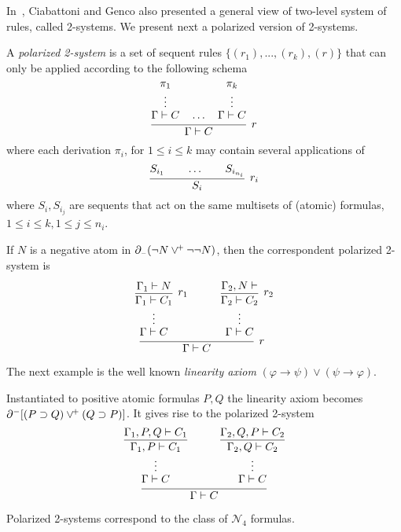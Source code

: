 In~\cite{DBLP:journals/tocl/CiabattoniG18}, Ciabattoni and Genco also presented a general view of two-level system of rules, called 2-systems. We present next a polarized version of 2-systems.
\begin{definition}
A  {\em polarized 2-system} is a set of sequent rules $\{(r_1), . . . , (r_k ), (r)\}$ that can only be applied according to the following schema
\[
\infer[r]{\Gamma\vdash C}
      {\deduce{\Gamma\vdash C\strut}
              {\deduce{\vdots}
                      {\pi_1}}\quad\ldots\quad
       \deduce{\Gamma\vdash C\strut}
              {\deduce{\vdots}
                      {\pi_k}}}
\]
where each derivation $\pi_i$, for $1\leq i \leq k$ may contain several applications of
\[
\infer[r_i]{S_i}
{S_{i_1}\qquad\ldots\qquad S_{i_{n_i}}}
\]
where $S_i,S_{i_j}$ are sequents that act on the same multisets of (atomic) formulas, $1\leq i\leq k, 1\leq j\leq n_i$. 
\end{definition}
\begin{example}
If $N$ is a negative atom in $\partial_{\scriptscriptstyle -}(\neg N \vee^{\!+} \neg\neg N)$, then the correspondent polarized 2-system is 
\[
\infer[r]{\Gamma\vdash C}
      {\deduce{\Gamma\vdash C\strut}
              {\deduce{\vdots}
                      {\infer[r_1]{\Gamma_1\vdash C_1}{\Gamma_1\vdash N}}}\quad&\quad
       \deduce{\Gamma\vdash C\strut}
              {\deduce{\vdots}
                      {\infer[r_2]{\Gamma_2\vdash C_2}
                             {\deduce{\Gamma_2,N\vdash }{}}}}}
\]
\end{example}
The next example is the well known \emph{linearity axiom} $(\varphi\to \psi)\vee (\psi\to \varphi)$.
\begin{example}\label{ex:linearity}
Instantiated to positive atomic formulas $P,Q$  the linearity axiom becomes $\partial^-[(P\supset Q)\vee^{\!+} (Q\supset P)]$. It gives rise to the polarized 2-system 
\[
\infer{\Gamma\vdash C}
      {\deduce{\Gamma\vdash C\strut}
              {\deduce{\vdots}
                      {\infer{\Gamma_1,P\vdash C_1}{\Gamma_1,P,Q\vdash C_1}}}\quad&\quad
       \deduce{\Gamma\vdash C\strut}
              {\deduce{\vdots}
                             {\infer{\Gamma_2,Q\vdash C_2}{\Gamma_2,Q,P\vdash C_2}}}}
\]
\end{example}
\begin{claim} Polarized 2-systems correspond to the class of
$\mathcal{N}_4$ formulas.
\end{claim}
